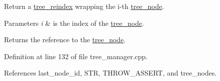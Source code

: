 Return a \hyperlink{classtree__reindex}{tree\+\_\+reindex} wrapping the i-\/th \hyperlink{classtree__node}{tree\+\_\+node}. 


\begin{DoxyParams}{Parameters}
{\em i} & is the index of the \hyperlink{classtree__node}{tree\+\_\+node}. \\
\hline
\end{DoxyParams}
\begin{DoxyReturn}{Returns}
the reference to the \hyperlink{classtree__node}{tree\+\_\+node}. 
\end{DoxyReturn}


Definition at line 132 of file tree\+\_\+manager.\+cpp.



References last\+\_\+node\+\_\+id, S\+TR, T\+H\+R\+O\+W\+\_\+\+A\+S\+S\+E\+RT, and tree\+\_\+nodes.



